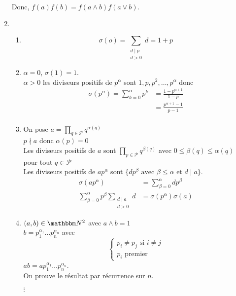 \begin{enumerate}
	Donc, $f(a)f(b) = f(a\wedge b)f(a\vee b)$.
	\item
		\begin{enumerate}
			\item \[
				\sigma(o) = \sum_{\begin{array}{c}
						d  \mid p\\
						d > 0
				\end{array} } d = 1 + p
				\] 
			\item
				$\alpha = 0$, $\sigma(1) = 1$.\\
				$\alpha>0$ les diviseurs positifs de $p^\alpha$ sont $1, p, p^2, \ldots, p^\alpha$ donc 
				\begin{align*}
					\sigma(p^\alpha) = \sum_{k=0}^{\alpha} p^k &= \frac{1 - p^{\alpha+1}}{1 - p}\\
					&= \frac{p^{\alpha+1} - 1}{p - 1} \\
				\end{align*}
			\item On pose $a = \prod_{q \in \mathcal{P}} q^{\alpha(q)}$\\
				$p\nmid a$  donc  $\alpha(p) = 0$\\
				Les diviseurs positifs de $a$ sont $\prod_{p \in \mathcal{P}}q^{\beta(q)}$ avec $0 \le \beta(q) \le \alpha(q)$ pour tout $q  \in \mathcal{P}$\\
				Les diviseurs positifs de $ap^{\alpha}$ sont $\{dp^\beta \text{ avec } \beta \le \alpha \text{ et } d \mid a\}$.
				\begin{align*}
					\sigma(ap^\alpha) &= \sum_{\beta=0}^{\alpha} dp^\beta\\
					\sum_{\beta=0}^{\alpha} p^\beta \sum_{\begin{array}{c}
						d \mid a\\
						d > 0
					\end{array}} d
					&= \sigma(p^\alpha)\sigma(a)
				\end{align*}

			\item $(a,b) \in \N^2$ avec $a \wedge b = 1$ \\
				$b = p_1^{\alpha_1}\ldots p_n^{\alpha_n}$ avec \[
				\begin{cases}
					p_i \neq  p_j \text{ si } i \neq j\\
					p_i \text{ premier }
				\end{cases}
				\] 
				$ab = ap_1^{\alpha_1}\ldots p_n^{\alpha_n}$.\\
				On prouve le résultat par récurrence sur $n$.\\
				\begin{center}
					$\vdots$
				\end{center}
		\end{enumerate}
\end{enumerate}
